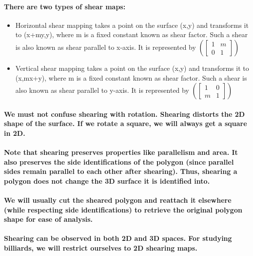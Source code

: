 \documentclass{report}
\begin{document}
\paragraph{There are two types of shear maps:}

\begin{itemize}
\item Horizontal shear mapping takes a point on the surface (x,y) and transforms it to (x+my,y), where m is a fixed constant known as shear factor. Such a shear is also known as shear parallel to x-axis. It is represented by 
$ (\begin{bmatrix}
1&m\\0&1
\end{bmatrix})$ 

\item Vertical shear mapping takes a point on the surface (x,y) and transforms it to (x,mx+y), where m is a fixed constant known as shear factor. Such a shear is also known as shear parallel to y-axis. It is represented by
$ (\begin{bmatrix}
1&0\\m&1
\end{bmatrix})$ 
\end{itemize}

\paragraph{We must not confuse shearing with rotation. Shearing distorts the 2D shape of the surface. If we rotate a square, we will always get a square in 2D.}

\paragraph{Note that shearing preserves properties like parallelism and area. It also preserves the side identifications of the polygon (since parallel sides remain parallel to each other after shearing). Thus, shearing a polygon does not change the 3D surface it is identified into.}

\paragraph{We will usually cut the sheared polygon and reattach it elsewhere (while respecting side identifications) to retrieve the original polygon shape for ease of analysis.}

\paragraph{Shearing can be observed in both 2D and 3D spaces. For studying billiards, we will restrict ourselves to 2D shearing maps.\\}
\end{document}
